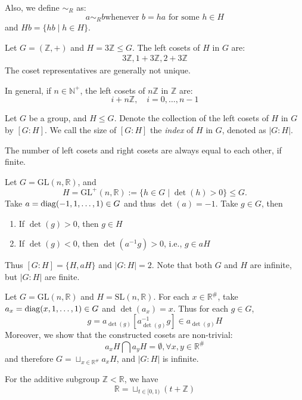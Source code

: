 Also, we define $\sim_R$ as:
\[
a\sim_Rb\mbox{whenever $b=ha$ for some $h\in H$}
\]
and $Hb=\{hb\mid h\in H\}.$
\begin{example}
Let $G=(\mathbb{Z},+)$ and $H=3\mathbb{Z}\le G$. The left cosets of $H$ in $G$ are:
\[
\begin{array}{ll}
3\mathbb{Z},1+3\mathbb{Z},2+3\mathbb{Z}
\end{array}
\]
The coset representatives are generally not unique.
\end{example}
In general, if $n\in\mathbb{N}^+$, the left cosets of $n\mathbb{Z}$ in $\mathbb{Z}$ are:
\[
i+n\mathbb{Z},\quad
i=0,\dots,n-1
\]
\begin{definition}
Let $G$ be a group, and $H\le G$. Denote the collection of the left cosets of $H$ in $G$ by $[G:H]$. We call the size of $[G:H]$ the \emph{index} of $H$ in $G$, denoted as $|G:H|$.
\end{definition}
\begin{remark}
The number of left cosets and right cosets are always equal to each other, if finite.
\end{remark}
\begin{example}
Let $G=\mbox{GL}(n,\mathbb{R})$, and
\[
H=\mbox{GL}^+(n,\mathbb{R}):=\{h\in G\mid \det(h)>0\}\le G.
\]
Take $a=\operatorname{diag}(-1,1,\dots,1)\in G$ and thus $\det(a)=-1$. Take $g\in G$, then
\begin{enumerate}
\item
If $\det(g)>0$, then $g\in H$
\item
If $\det(g)<0$, then $\det(a^{-1}g)>0$, i.e., $g\in aH$
\end{enumerate}
Thus $[G:H] = \{H,aH\}$ and $|G:H|=2$. Note that both $G$ and $H$ are infinite, but $|G:H|$ are finite.
\end{example}
\begin{example}
Let $G=\mbox{GL}(n,\mathbb{R})$ and $H=\mbox{SL}(n,\mathbb{R})$. For each $x\in\mathbb{R}^{\#}$, take $a_x=\operatorname{diag}(x,1,\dots,1)\in G$ and $\det(a_x) = x$. Thus for each $g\in G$,
\[
g = a_{\det(g)}\left[a_{\det(g)}^{-1}g\right]\in a_{\det(g)}H
\]
Moreover, we show that the constructed cosets are non-trivial:
\[
a_x H\bigcap a_yH=\emptyset,\forall x,y\in\mathbb{R}^{\#}
\]
and therefore $G=\sqcup_{x\in\mathbb{R}^{\#}}a_xH$, and $|G:H|$ is infinite.
\end{example}
\begin{proposition}
For the additive subgroup $\mathbb{Z}<\mathbb{R}$, we have
\[
\mathbb{R}=\sqcup_{t\in[0,1)}(t+\mathbb{Z})
\]
\end{proposition}
